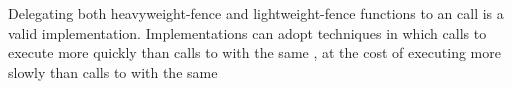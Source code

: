 \begin{note} Delegating both heavyweight-fence and lightweight-fence functions to an
 call is a valid implementation. Implementations can adopt
techniques in which calls to  execute more quickly than calls
to  with the same , at the cost of
 executing more slowly than calls to
 with the same 
\end{note}  


